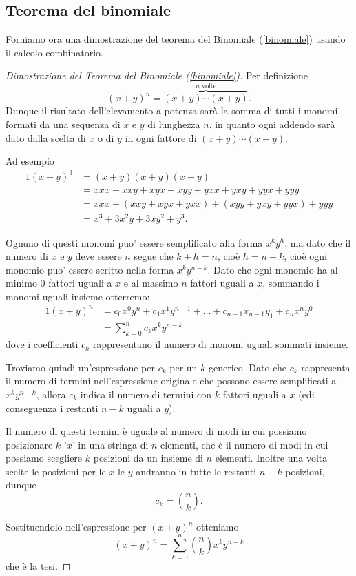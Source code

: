 \subsection{Teorema del binomiale}
Forniamo ora una dimostrazione del teorema del Binomiale (\ref{binomiale}) usando il calcolo combinatorio.
\begin{proof}[Dimostrazione del Teorema del Binomiale (\ref{binomiale})]
    Per definizione \[
        (x + y)^n = \overbrace{(x+y)\cdots (x+y)}^{n \text{ volte}}.
    \] Dunque il risultato dell'elevamento a potenza sarà la somma di tutti i monomi formati da una sequenza di $x$ e $y$ di lunghezza $n$, in quanto ogni addendo sarà dato dalla scelta di $x$ o di $y$ in ogni fattore di $(x+y)\cdots (x+y)$.

    Ad esempio \begin{alignat*}{1}
        (x+y)^3 &= (x+y)(x+y)(x+y) \\
                &= xxx + xxy + xyx + xyy + yxx + yxy + yyx + yyy\\
                &= xxx + (xxy + xyx + yxx) + (xyy + yxy + yyx) + yyy\\
                &= x^3 + 3x^2y + 3xy^2 + y^3.
    \end{alignat*}

    Ognuno di questi monomi puo' essere semplificato alla forma $x^ky^h$, ma dato che il numero di $x$ e $y$ deve essere $n$ segue che $k + h = n$, cioè $h = n - k$, cioè ogni monomio puo' essere scritto nella forma $x^ky^{n-k}$. Dato che ogni monomio ha al minimo 0 fattori uguali a $x$ e al massimo $n$ fattori uguali a $x$, sommando i monomi uguali insieme otterremo:
    \begin{alignat*}
        {1}
        (x+y)^n &= c_0x^0y^n + c_1x^1y^{n-1} + \dots + c_{n-1}x_{n-1}y_1 + c_nx^ny^0\\
        &= \sum_{k = 0}^n c_kx^ky^{n-k}
    \end{alignat*}
    dove i coefficienti $c_k$ rappresentano il numero di monomi uguali sommati insieme.

    Troviamo quindi un'espressione per $c_k$ per un $k$ generico. Dato che $c_k$ rappresenta il numero di termini nell'espressione originale che possono essere semplificati a $x^ky^{n-k}$, allora $c_k$ indica il numero di termini con $k$ fattori uguali a $x$ (edi conseguenza i restanti $n-k$ uguali a $y$). 
    
    Il numero di questi termini è uguale al numero di modi in cui possiamo posizionare $k$ '$x$' in una stringa di $n$ elementi, che è il numero di modi in cui possiamo scegliere $k$ posizioni da un insieme di $n$ elementi. Inoltre una volta scelte le posizioni per le $x$ le $y$ andranno in tutte le restanti $n-k$ posizioni, dunque \[
        c_k = \binom{n}{k}.
    \]

    Sostituendolo nell'espressione per $(x+y)^n$ otteniamo \[
        (x+y)^n = \sum_{k = 0}^n \binom{n}{k}x^ky^{n-k}
    \] che è la tesi.
\end{proof}

